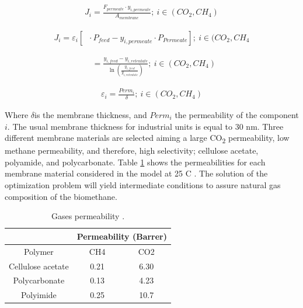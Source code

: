 \begin{refsection}[referencesCh7]
\begin{align}
{J_i} = \frac{{{F_{permeate}}\cdot{y_{i,permeate}}}}{{{A_{membrane}}}};\ i \in (CO_{2},CH_{4}) \label{eq:ChEEq18}
\end{align}

\begin{align}
{J_i} = {\varepsilon _i}\left[ {\mathop {{y_{feedside}}}\limits^{} \cdot{P_{feed}} - {y_{i,permeate}}\cdot P{}_{Permeate}} \right]; \ i \in (CO_{2},CH_{4} \label{eq:ChEEq19}
\end{align}

\begin{align}
\mathop {{y_{feedside}}}\limits^{}  = \frac{{{y_{i,feed}} - {y_{i,retentate}}}}{{\ln \left( {\frac{{{y_{i,feed}}}}{{{y_{i,retentate}}}}} \right)}}; \ i \in (CO_{2},CH_{4}) \label{eq:ChEEq20}
\end{align}

\begin{align}
{\varepsilon _i} = \frac{{Perm_{i}}}{\delta }; \ i \in (CO_{2},CH_{4}) \label{eq:ChEEq21}
\end{align}

Where $\delta$is the membrane thickness, and ${Perm_{i}}$ the permeability of the component $i$. The usual membrane thickness for industrial units is equal to 30 nm. Three different membrane materials are selected aiming a large CO\textsubscript{2} permeability, low methane permeability, and therefore, high selectivity; cellulose acetate, polyamide, and polycarbonate. Table \ref{table:ChETable4} shows the permeabilities for each membrane material considered in the model at 25 \textdegree C \citep{vrbova2017upgrading}. The solution of the optimization problem will yield intermediate conditions to assure natural gas composition of the biomethane.

\begin{table}[h]
	\centering
	\caption{Gases permeability \protect\citet{vrbova2017upgrading}.}
	\label{table:ChETable4}
	\begin{tabular}{@{}ccc@{}}
		\toprule
		& \multicolumn{2}{c}{Permeability (Barrer)} \\ \midrule
		Polymer           & CH4                 & CO2                 \\
		Cellulose acetate & 0.21                & 6.30                \\
		Polycarbonate     & 0.13                & 4.23                \\
		Polyimide         & 0.25                & 10.7                \\ \bottomrule
	\end{tabular}
\end{table}


\end{refsection}
